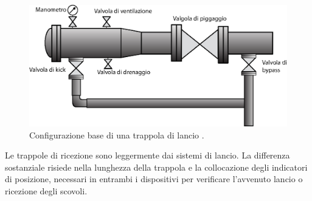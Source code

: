 \begin{figure}[htbp]
	\centering
	\includegraphics[width=.7\textwidth]{fig/pig/launcher.eps}
	\caption{Configurazione base di una trappola di lancio \parencite{davidson2002introduction}.}
	\label{fig:piglauncher}
\end{figure}

Le trappole di ricezione sono leggermente dai sistemi di lancio. La differenza sostanziale risiede nella lunghezza della trappola e la collocazione degli indicatori di posizione, necessari in entrambi i dispositivi per verificare l'avvenuto lancio o ricezione degli scovoli.

